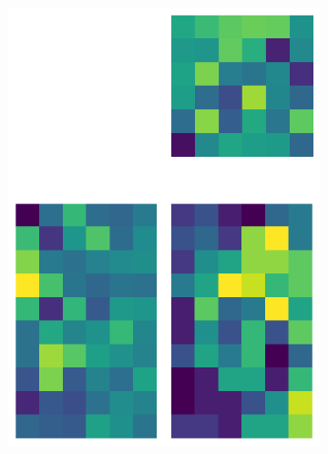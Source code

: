\documentclass[10pt,twocolumn]{article}
\begin{document}
\begin{figure}[H]
\begin{subfigure}[t]{.15\textwidth}
\includegraphics[scale=.2]{semi-structured-matrix-reconstruction-PCs-6.png}
\caption{ }
\end{subfigure}
\begin{subfigure}[t]{.15\textwidth}
\centering

\end{subfigure}
\end{figure}
\end{document}

